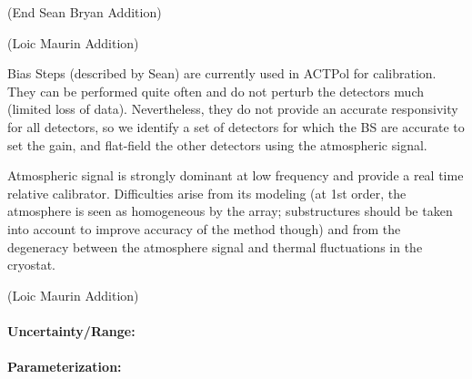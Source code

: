 (End Sean Bryan Addition)

(Loic Maurin Addition)

Bias Steps (described by Sean) are currently used in ACTPol for calibration. They can be performed quite often and do not perturb the detectors much (limited loss of data). Nevertheless, they do not provide an accurate responsivity for all detectors, so we identify a set of detectors for which the BS are accurate to set the gain, and flat-field the other detectors using the atmospheric signal.

Atmospheric signal is strongly dominant at low frequency and provide a real time relative calibrator. Difficulties arise from its modeling (at 1st order, the atmosphere is seen as homogeneous by the array; substructures should be taken into account to improve accuracy of the method though) and from the degeneracy between the atmosphere signal and thermal fluctuations in the cryostat.

(Loic Maurin Addition)


\paragraph{Uncertainty/Range:}

\paragraph{Parameterization:}
